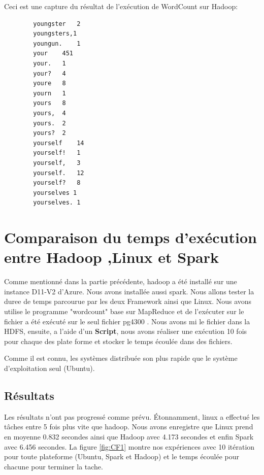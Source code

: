 \documentclass[11pt]{article}
\begin{document}
Ceci est une capture du résultat de l'exécution de WordCount sur Hadoop:
\\
\begin{scriptsize}
  \begin{lstlisting}
        youngster	2
        youngsters,1
        youngun.	1
        your	451
        your.	1
        your?	4
        youre	8
        yourn	1
        yours	8
        yours,	4
        yours.	2
        yours?	2
        yourself	14
        yourself!	1
        yourself,	3
        yourself.	12
        yourself?	8
        yourselves 1
        yourselves. 1

  \end{lstlisting}
\end{scriptsize}
\section{Comparaison du temps d'exécution entre Hadoop ,Linux et Spark}
Comme mentionné dans la partie précédente, hadoop a été installé sur une
instance D11-V2 d'Azure. Nous avons installée aussi spark. Nous allons tester
la duree de temps parcourue par les deux Framework ainsi que Linux. Nous avons
utilise le programme "wordcount" base sur MapReduce et de l'exécuter sur le
fichier a été exécuté sur le seul fichier pg4300 \cite{wwwguten70}. Nous
avons mi le fichier dans la HDFS, ensuite, a l'aide d'un \textbf{Script}, nous
avons réaliser une exécution 10 fois pour chaque des plate forme et stocker le
temps écoulée dans des fichiers. 

Comme il est connu, les systèmes distribuée son plus rapide que le système d'exploitation seul (Ubuntu). 


\subsection{Résultats}

Les résultats n'ont pas progressé comme prévu. Étonnamment, linux a effectué les tâches entre 5 fois plus vite que hadoop. Nous avons enregistre que Linux prend en moyenne 0.832 secondes ainsi que Hadoop avec 4.173 secondes et enfin Spark avec 6.456 secondes. La figure \ref{fig:CF1} montre nos expériences avec 10 itération pour toute plateforme (Ubuntu, Spark et Hadoop) et le temps écoulée pour chacune pour terminer la tache.
\end{document}
